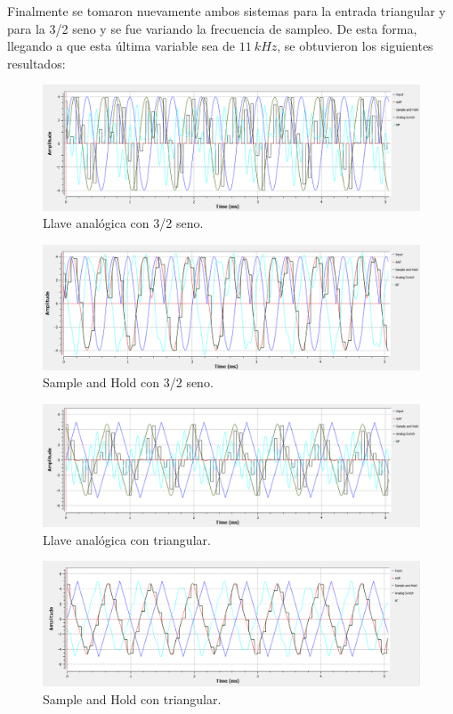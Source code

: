 Finalmente se tomaron nuevamente ambos sistemas para la entrada triangular y para la 3/2 seno y se fue variando la frecuencia de sampleo. De esta forma, llegando a que esta última variable sea de $11 \ kHz$, se obtuvieron los siguientes resultados:
\begin{figure}[H]
\centering
	\includegraphics[width=0.8\linewidth]{ImagenesEjercicio6/6d-32LA11k.png}
	\caption{Llave analógica con 3/2 seno.}
	\label{fig:32la}
\end{figure}
\begin{figure}[H]
\centering
	\includegraphics[width=0.8\linewidth]{ImagenesEjercicio6/6d-32SH11k.png}
	\caption{Sample and Hold con 3/2 seno.}
	\label{fig:32sh}
\end{figure}
\begin{figure}[H]
\centering
	\includegraphics[width=0.8\linewidth]{ImagenesEjercicio6/6d-TRLA11k.png}
	\caption{Llave analógica con triangular.}
	\label{fig:trla}
\end{figure}
\begin{figure}[H]
\centering
	\includegraphics[width=0.8\linewidth]{ImagenesEjercicio6/6d-TRSH11k.png}
	\caption{Sample and Hold con triangular.}
	\label{fig:trsh}
\end{figure}

